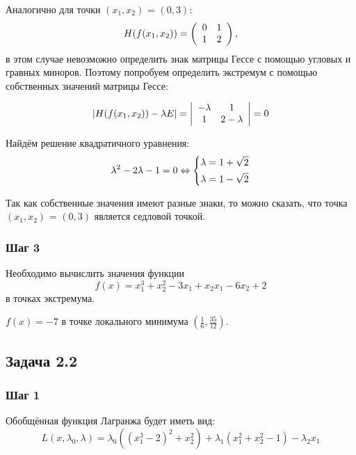 \documentclass[a4paper, 12pt]{article}   	%
\begin{document}
    Аналогично для точки $(x_1, x_2)$ = $(0, 3)$:
    \begin{equation}
        H(f(x_1, x_2)) = 
        \left(
        \begin{array}{c c}
            0 & 1\\
            1 & 2
        \end{array}
        \right),
    \end{equation}
    в этом случае невозможно определить знак матрицы Гессе с помощью угловых и гравных миноров. Поэтому попробуем определить экстремум с помощью собственных значений матрицы Гессе:
    
    \begin{equation}
        |H(f(x_1, x_2)) - \lambda E |= 
        \left|
        \begin{array}{c c}
            -\lambda & 1\\
            1 & 2-\lambda
        \end{array}
        \right|
        = 0 
    \end{equation}
    
    Найдём решение квадратичного уравнения:
    \begin{equation}
        \lambda^2 - 2\lambda - 1 = 0 
        \Leftrightarrow
        \begin{dcases*}
            \lambda = 1 + \sqrt{2} \\
            \lambda = 1 - \sqrt{2}
        \end{dcases*}
    \end{equation}
    
    Так как собственные значения имеют разные знаки, то можно сказать, что точка $(x_1, x_2)$ = $(0, 3)$ является седловой точкой.
    
    
\subsubsection{Шаг 3}
    Необходимо вычислить значения функции 
    \begin{equation}
        f(x) = x^3_1 + x^2_2 - 3x_1 + x_2 x_1 - 6x_2 + 2
    \end{equation}
    в точках экстремума.
    
    $f(x) = -7$ в точке локального минимума $(\frac{1}{6}, \frac{35}{12})$.

\subsection{Задача 2.2}
\subsubsection{Шаг 1}
    Обобщённая функция Лагранжа будет иметь вид:
    \begin{equation}
        L(x, \lambda_0, \lambda) = \lambda_0((x^3_1 - 2)^2 + x^2_2) + \lambda_1(x^2_1 + x^2_2 - 1) - \lambda_2 x_1
    \end{equation}
    
\end{document}
